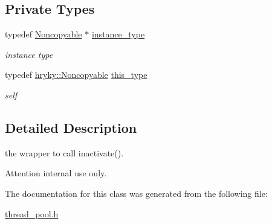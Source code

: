 \subsection*{Private Types}
\begin{DoxyCompactItemize}
\item 
\hypertarget{classhryky_1_1_noncopyable_aaf87abb55f700af85ecb0895f6178821}{typedef \hyperlink{classhryky_1_1_noncopyable}{Noncopyable} $\ast$ \hyperlink{classhryky_1_1_noncopyable_aaf87abb55f700af85ecb0895f6178821}{instance\-\_\-type}}\label{classhryky_1_1_noncopyable_aaf87abb55f700af85ecb0895f6178821}

\begin{DoxyCompactList}\small\item\em instance type \end{DoxyCompactList}\item 
\hypertarget{classhryky_1_1_noncopyable_acf13ad1c98a76247a561dff514979da5}{typedef \hyperlink{classhryky_1_1_noncopyable}{hryky\-::\-Noncopyable} \hyperlink{classhryky_1_1_noncopyable_acf13ad1c98a76247a561dff514979da5}{this\-\_\-type}}\label{classhryky_1_1_noncopyable_acf13ad1c98a76247a561dff514979da5}

\begin{DoxyCompactList}\small\item\em self \end{DoxyCompactList}\end{DoxyCompactItemize}


\subsection{Detailed Description}
the wrapper to call inactivate(). 

\begin{DoxyAttention}{Attention}
internal use only. 
\end{DoxyAttention}


The documentation for this class was generated from the following file\-:\begin{DoxyCompactItemize}
\item 
\hyperlink{thread__pool_8h}{thread\-\_\-pool.\-h}\end{DoxyCompactItemize}
